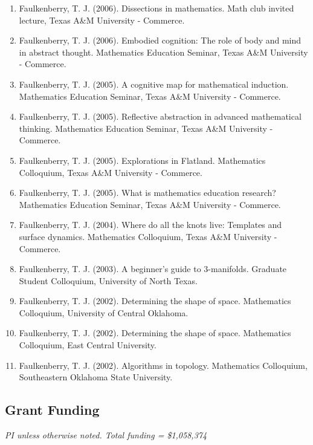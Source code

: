 \documentclass[article,10pt]{article}
\begin{document}
\begin{enumerate}
\item Faulkenberry, T. J. (2006). Dissections in mathematics. Math club invited lecture, Texas A\&M University - Commerce.
\item Faulkenberry, T. J. (2006). Embodied cognition: The role of body and mind in abstract thought. Mathematics Education Seminar, Texas A\&M University - Commerce.
\item Faulkenberry, T. J. (2005). A cognitive map for mathematical induction. Mathematics Education Seminar, Texas A\&M University - Commerce.
\item Faulkenberry, T. J. (2005). Reflective abstraction in advanced mathematical thinking. Mathematics Education Seminar, Texas A\&M University - Commerce.
\item Faulkenberry, T. J. (2005). Explorations in Flatland. Mathematics Colloquium, Texas A\&M University - Commerce.
\item Faulkenberry, T. J. (2005). What is mathematics education research? Mathematics Education Seminar, Texas A\&M University - Commerce.
\item Faulkenberry, T. J. (2004). Where do all the knots live: Templates and surface dynamics. Mathematics Colloquium, Texas A\&M University - Commerce.
\item Faulkenberry, T. J. (2003). A beginner’s guide to 3-manifolds. Graduate Student Colloquium, University of North Texas.
\item Faulkenberry, T. J. (2002). Determining the shape of space. Mathematics Colloquium, University of Central Oklahoma.
\item Faulkenberry, T. J. (2002). Determining the shape of space. Mathematics Colloquium, East Central University.
\item Faulkenberry, T. J. (2002). Algorithms in topology. Mathematics Colloquium, Southeastern Oklahoma State University.
\end{enumerate}
\subsection*{Grant Funding}
\label{sec:orgf30ee1b}

\emph{PI unless otherwise noted.  Total funding = \$1,058,374}
\end{document}
